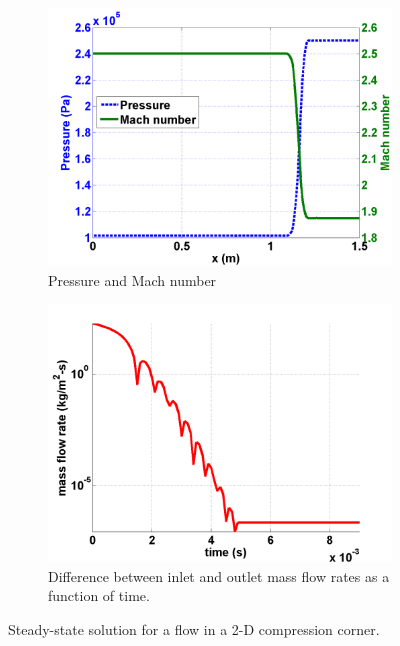\documentclass[preprint,10pt]{elsarticle}
\begin{document}
\begin{figure}[H]
        \begin{subfigure}[b]{0.49\textwidth}
                \centering
                \includegraphics[width=\textwidth]{mach_number_pressure.png}
                \caption{Pressure and Mach number}
                \label{fig:2d_corner_isomach}
        \end{subfigure}        

        \begin{subfigure}[b]{0.49\textwidth}
                \centering
                \includegraphics[width=\textwidth]{CompressionCorner2DQ.png}
                \caption{Difference between inlet and outlet mass flow rates as a function of time.}
                \label{fig:2d_convergence}
        \end{subfigure}
        \caption{Steady-state solution for a flow in a 2-D compression corner.}\label{fig:2d_corner}
\end{figure}
\end{document}
